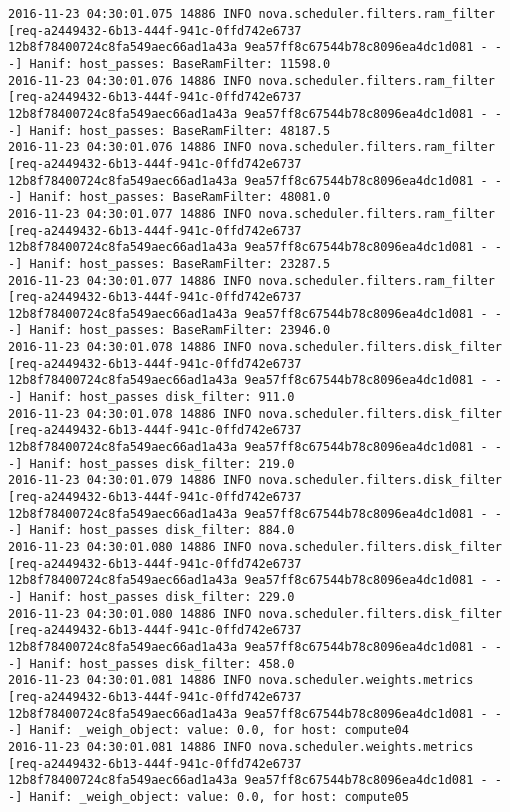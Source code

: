 \begin{lstlisting}[frame=single, caption={The filter scheduler log trace for 10 virtual instances}, label={lst:filterschedulercodetracelog10vi}, escapechar=|]
2016-11-23 04:30:01.075 14886 INFO nova.scheduler.filters.ram_filter [req-a2449432-6b13-444f-941c-0ffd742e6737 12b8f78400724c8fa549aec66ad1a43a 9ea57ff8c67544b78c8096ea4dc1d081 - - -] Hanif: host_passes: BaseRamFilter: 11598.0
2016-11-23 04:30:01.076 14886 INFO nova.scheduler.filters.ram_filter [req-a2449432-6b13-444f-941c-0ffd742e6737 12b8f78400724c8fa549aec66ad1a43a 9ea57ff8c67544b78c8096ea4dc1d081 - - -] Hanif: host_passes: BaseRamFilter: 48187.5
2016-11-23 04:30:01.076 14886 INFO nova.scheduler.filters.ram_filter [req-a2449432-6b13-444f-941c-0ffd742e6737 12b8f78400724c8fa549aec66ad1a43a 9ea57ff8c67544b78c8096ea4dc1d081 - - -] Hanif: host_passes: BaseRamFilter: 48081.0
2016-11-23 04:30:01.077 14886 INFO nova.scheduler.filters.ram_filter [req-a2449432-6b13-444f-941c-0ffd742e6737 12b8f78400724c8fa549aec66ad1a43a 9ea57ff8c67544b78c8096ea4dc1d081 - - -] Hanif: host_passes: BaseRamFilter: 23287.5
2016-11-23 04:30:01.077 14886 INFO nova.scheduler.filters.ram_filter [req-a2449432-6b13-444f-941c-0ffd742e6737 12b8f78400724c8fa549aec66ad1a43a 9ea57ff8c67544b78c8096ea4dc1d081 - - -] Hanif: host_passes: BaseRamFilter: 23946.0
2016-11-23 04:30:01.078 14886 INFO nova.scheduler.filters.disk_filter [req-a2449432-6b13-444f-941c-0ffd742e6737 12b8f78400724c8fa549aec66ad1a43a 9ea57ff8c67544b78c8096ea4dc1d081 - - -] Hanif: host_passes disk_filter: 911.0
2016-11-23 04:30:01.078 14886 INFO nova.scheduler.filters.disk_filter [req-a2449432-6b13-444f-941c-0ffd742e6737 12b8f78400724c8fa549aec66ad1a43a 9ea57ff8c67544b78c8096ea4dc1d081 - - -] Hanif: host_passes disk_filter: 219.0
2016-11-23 04:30:01.079 14886 INFO nova.scheduler.filters.disk_filter [req-a2449432-6b13-444f-941c-0ffd742e6737 12b8f78400724c8fa549aec66ad1a43a 9ea57ff8c67544b78c8096ea4dc1d081 - - -] Hanif: host_passes disk_filter: 884.0
2016-11-23 04:30:01.080 14886 INFO nova.scheduler.filters.disk_filter [req-a2449432-6b13-444f-941c-0ffd742e6737 12b8f78400724c8fa549aec66ad1a43a 9ea57ff8c67544b78c8096ea4dc1d081 - - -] Hanif: host_passes disk_filter: 229.0
2016-11-23 04:30:01.080 14886 INFO nova.scheduler.filters.disk_filter [req-a2449432-6b13-444f-941c-0ffd742e6737 12b8f78400724c8fa549aec66ad1a43a 9ea57ff8c67544b78c8096ea4dc1d081 - - -] Hanif: host_passes disk_filter: 458.0
2016-11-23 04:30:01.081 14886 INFO nova.scheduler.weights.metrics [req-a2449432-6b13-444f-941c-0ffd742e6737 12b8f78400724c8fa549aec66ad1a43a 9ea57ff8c67544b78c8096ea4dc1d081 - - -] Hanif: _weigh_object: value: 0.0, for host: compute04
2016-11-23 04:30:01.081 14886 INFO nova.scheduler.weights.metrics [req-a2449432-6b13-444f-941c-0ffd742e6737 12b8f78400724c8fa549aec66ad1a43a 9ea57ff8c67544b78c8096ea4dc1d081 - - -] Hanif: _weigh_object: value: 0.0, for host: compute05

\end{lstlisting}
